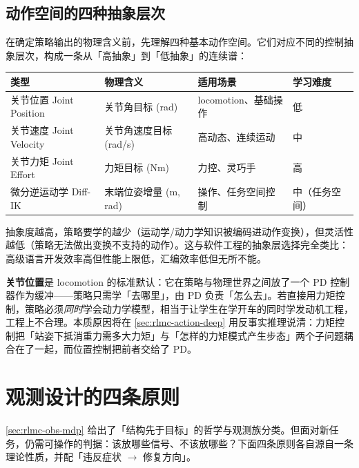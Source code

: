\subsection{动作空间的四种抽象层次}
\label{sec:rlmc-action-types}

在确定策略输出的物理含义前，先理解四种基本动作空间。它们对应不同的控制抽象层次，构成一条从「高抽象」到「低抽象」的连续谱：

\begin{center}
\small
\begin{tabular}{@{}llll@{}}
\toprule
类型 & 物理含义 & 适用场景 & 学习难度 \\
\midrule
关节位置 Joint Position & 关节角目标 (rad) & locomotion、基础操作 & 低 \\
关节速度 Joint Velocity & 关节角速度目标 (rad/s) & 高动态、连续运动 & 中 \\
关节力矩 Joint Effort & 力矩目标 (Nm) & 力控、灵巧手 & 高 \\
微分逆运动学 Diff-IK & 末端位姿增量 (m, rad) & 操作、任务空间控制 & 中（任务空间） \\
\bottomrule
\end{tabular}
\end{center}

\begin{insight}\label{ins:rlmc-abstraction}
抽象度越高，策略要学的越少（运动学/动力学知识被编码进动作变换），但灵活性越低（策略无法做出变换不支持的动作）。这与软件工程的抽象层选择完全类比：高级语言开发效率高但性能上限低，汇编效率低但无所不能。

\textbf{关节位置}是 locomotion 的标准默认：它在策略与物理世界之间放了一个 PD 控制器作为缓冲——策略只需学「去哪里」，由 PD 负责「怎么去」。若直接用力矩控制，策略必须\emph{同时}学会动力学模型，相当于让学生在学开车的同时学发动机工程，工程上不合理。本质原因将在 \cref{sec:rlmc-action-deep} 用反事实推理说清：力矩控制把「站姿下抵消重力需多大力矩」与「怎样的力矩模式产生步态」两个子问题耦合在了一起，而位置控制把前者交给了 PD。
\end{insight}

\section{观测设计的四条原则}
\label{sec:rlmc-principles}

\cref{sec:rlmc-obs-mdp} 给出了「结构先于目标」的哲学与观测族分类。但面对新任务，仍需可操作的判据：该放哪些信号、不该放哪些？下面四条原则各自源自一条理论性质，并配「违反症状 $\to$ 修复方向」。


